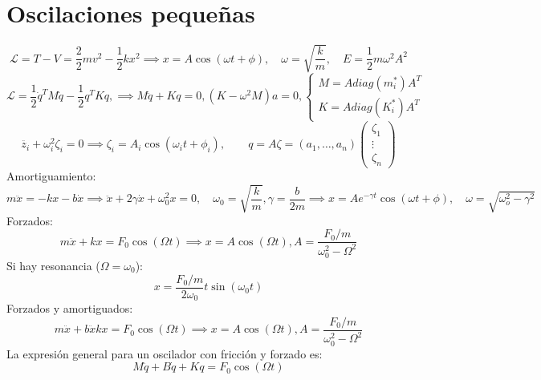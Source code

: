 \documentclass{myclass}
\newcommand{\1}{\tikz[baseline=(char.base)]{
            \node[shape=circle,draw,inner sep=1pt] (char) {1};}}
\newcommand{\2}{\tikz[baseline=(char.base)]{
            \node[shape=circle,draw,inner sep=1pt] (char) {2};}}
\renewcommand{\L}{\mathcal{L}}
\begin{document}
 \section{Oscilaciones pequeñas}
 $$
  \L = T-V = \frac{2}{2}mv^2 - \frac{1}{2}kx^2 \implies x = A\cos(\omega t + \phi),\quad \omega = \sqrt{\frac{k}{m}}, \quad E = \frac{1}{2} m\omega^2 A^2
 $$
 \[
 \L = \frac{1}{2} \dot{q}^T M \dot{q} - \frac{1}{2} q^T K q, \implies M \ddot{q} + Kq = 0, (K-\omega^2 M)a = 0, \begin{cases}
   M = Adiag(m^*_i)A^T \\
   K = Adiag(K^*_i)A^T 
 \end{cases}
 \] 
\[
\ddot{z_i} + \omega_i^2 \zeta_i = 0 \implies \zeta_i = A_i\cos(\omega_it + \phi_i), \qquad q = A\zeta = (a_1, \ldots, a_n)\begin{pmatrix} \zeta_1 \\ \vdots \\ \zeta_n \end{pmatrix} 
\] 
Amortiguamiento:
\[
m\ddot{x} = -kx -b \dot{x} \implies \ddot{x} + 2 \gamma \dot{x} + \omega_0^2x = 0, \quad \omega_0 = \sqrt{\frac{k}{m}}, \gamma = \frac{b}{2m} \implies x = Ae^{-\gamma t}\cos(\omega t+ \phi), \quad \omega = \sqrt{\omega_o^2 - \gamma^2} 
\] 
Forzados:
 \[
m \ddot{x} + kx = F_0\cos(\Omega t) \implies  x = A\cos(\Omega t),  A = \frac{F_0 / m}{\omega_0^2 -\Omega^2}
\] 
Si hay resonancia ($\Omega = \omega_0$):
\[
x = \frac{F_0/m}{2\omega_0}t\sin(\omega_0t)
\] 
Forzados y amortiguados:
 \[
m \ddot{x} + b\ddot{x} kx = F_0\cos(\Omega t) \implies x =  A\cos(\Omega t),  A = \frac{F_0 / m}{\omega_0^2 -\Omega^2}
\] 
La expresión general para un oscilador con fricción y forzado es:
 \[
M\ddot{q} + B\dot{q} + Kq = F_0\cos(\Omega t)
\] 
\end{document}

